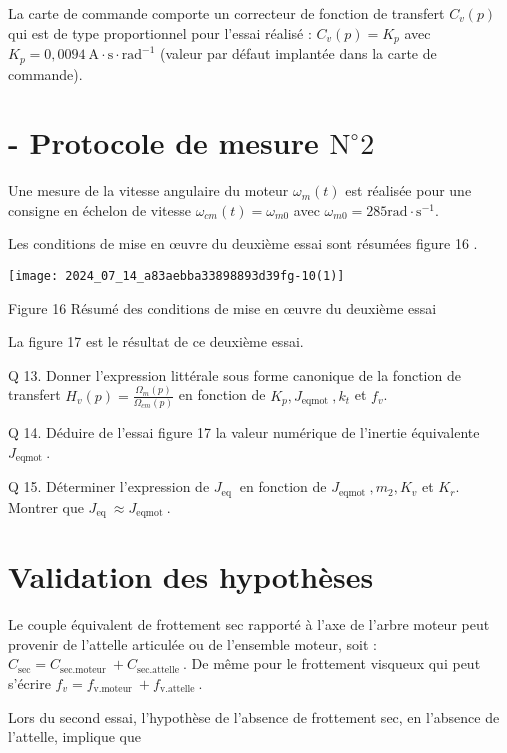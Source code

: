La carte de commande comporte un correcteur de fonction de transfert $C_{v}(p)$ qui est de type proportionnel pour l'essai réalisé : $C_{v}(p)=K_{p}$ avec $K_{p}=0,0094 \mathrm{~A} \cdot \mathrm{s} \cdot \mathrm{rad}^{-1}$ (valeur par défaut implantée dans la carte de commande).

\section*{- Protocole de mesure $\mathrm{N}^{\circ} 2$}
Une mesure de la vitesse angulaire du moteur $\omega_{m}(t)$ est réalisée pour une consigne en échelon de vitesse $\omega_{c m}(t)=\omega_{m 0}$ avec $\omega_{m 0}=285 \mathrm{rad} \cdot \mathrm{s}^{-1}$.

Les conditions de mise en œuvre du deuxième essai sont résumées figure 16 .

\begin{center}
\texttt{[image: 2024\_07\_14\_a83aebba33898893d39fg-10(1)]}
\end{center}

Figure 16 Résumé des conditions de mise en œuvre du deuxième essai

La figure 17 est le résultat de ce deuxième essai.

Q 13. Donner l'expression littérale sous forme canonique de la fonction de transfert $H_{v}(p)=\frac{\Omega_{m}(p)}{\Omega_{c m}(p)}$ en fonction de $K_{p}, J_{\text {eqmot }}, k_{t}$ et $f_{v}$.

Q 14. Déduire de l'essai figure 17 la valeur numérique de l'inertie équivalente $J_{\text {eqmot }}$.

Q 15. Déterminer l'expression de $J_{\text {eq }}$ en fonction de $J_{\text {eqmot }}, m_{2}, K_{v}$ et $K_{r}$. Montrer que $J_{\text {eq }} \approx J_{\text {eqmot }}$.

\section*{Validation des hypothèses}
Le couple équivalent de frottement sec rapporté à l'axe de l'arbre moteur peut provenir de l'attelle articulée ou de l'ensemble moteur, soit : $C_{\mathrm{sec}}=C_{\text {sec.moteur }}+C_{\text {sec.attelle }}$. De même pour le frottement visqueux qui peut s'écrire $f_{v}=f_{\text {v.moteur }}+f_{\text {v.attelle }}$.

Lors du second essai, l'hypothèse de l'absence de frottement sec, en l'absence de l'attelle, implique que

